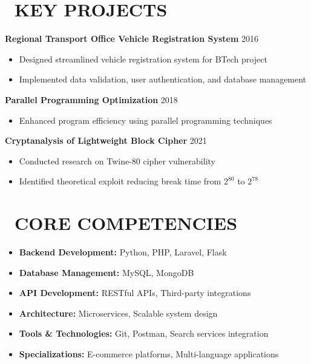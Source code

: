 \documentclass[10pt,a4paper]{article}
\begin{document}
\begin{paracol}{2}
\begin{rightcolumn}
\vspace{2mm}
\section*{\faCode\ KEY PROJECTS}

\textbf{\color{darkblue}Regional Transport Office Vehicle Registration System} \hfill \textcolor{mediumgray}{\footnotesize 2016}
\begin{itemize}[leftmargin=10pt]
    \item Designed streamlined vehicle registration system for BTech project
    \item Implemented data validation, user authentication, and database management
\end{itemize}
\vspace{1.5mm}
\textbf{\color{darkblue}Parallel Programming Optimization} \hfill \textcolor{mediumgray}{\footnotesize 2018}
\begin{itemize}[leftmargin=10pt]
    \item Enhanced program efficiency using parallel programming techniques
\end{itemize}
\vspace{1.5mm}
\textbf{\color{darkblue}Cryptanalysis of Lightweight Block Cipher} \hfill \textcolor{mediumgray}{\footnotesize 2021}
\begin{itemize}[leftmargin=10pt]
    \item Conducted research on Twine-80 cipher vulnerability
    \item Identified theoretical exploit reducing break time from $2^{80}$ to $2^{78}$
\end{itemize}

\vspace{1mm}
\section*{\faWrench\ CORE COMPETENCIES}
\small
\begin{itemize}[leftmargin=10pt]
    \item \textbf{Backend Development:} Python, PHP, Laravel, Flask
    \item \textbf{Database Management:} MySQL, MongoDB
    \item \textbf{API Development:} RESTful APIs, Third-party integrations
    \item \textbf{Architecture:} Microservices, Scalable system design
    \item \textbf{Tools \& Technologies:} Git, Postman, Search services integration
    \item \textbf{Specializations:} E-commerce platforms, Multi-language applications
\end{itemize}

\end{rightcolumn}
\end{paracol}
\end{document}
